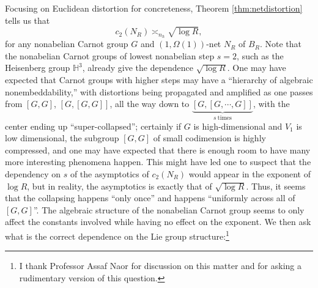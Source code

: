 \documentclass[11pt,reqno]{amsart}
\newcommand{\1}{\mathbf 1}
\begin{document}
Focusing on Euclidean distortion for concreteness, Theorem \ref{thm:netdistortion} tells us that
\[
c_2\left(N_R\right)\asymp_{n_h} \sqrt{\log R},
\]
for any nonabelian Carnot group $G$ and $\left(1,\Omega\left(1\right)\right)$-net $N_R$ of $B_R$. Note that the nonabelian Carnot groups of lowest nonabelian step $s=2$, such as the Heisenberg group $\mathbb{H}^3$, already give the dependence $\sqrt{\log R}$. One may have expected that Carnot groups with higher steps may have a ``hierarchy of algebraic nonembeddability,'' with distortions being propagated and amplified as one passes from $\left[G,G\right]$, $\left[G,\left[G,G\right]\right]$, all the way down to $\underbrace{\left[G,\left[G,\cdots,G\right]\right]}_{s\mathrm{~times}}$, with the center ending up ``super-collapsed''; certainly if $G$ is high-dimensional and $V_1$ is low dimensional, the subgroup $\left[G,G\right]$ of small codimension is highly compressed, and one may have expected that there is enough room to have many more interesting phenomena happen. This might have led one to suspect that the dependency on $s$ of the asymptotics of $c_2\left(N_R\right)$ would appear in the exponent of $\log R$, but in reality, the asymptotics is exactly that of $\sqrt{\log R}$. Thus, it seems that the collapsing happens ``only once'' and happens ``uniformly across all of $\left[G,G\right]$''. The algebraic structure of the nonabelian Carnot group seems to only affect the constants involved while having no effect on the exponent. We then ask what is the correct dependence on the Lie group structure:\footnote{I thank Professor Assaf Naor for discussion on this matter and for asking a rudimentary version of this question.}
\end{document}

